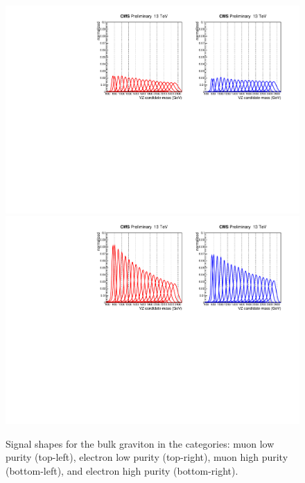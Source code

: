 \begin{figure}[p]
\begin{center}
\includegraphics[scale=0.80]{figures/fits/sigShapeLP.pdf}\\
\includegraphics[scale=0.80]{figures/fits/sigShapeHP.pdf}
\caption[Signal shapes]{Signal shapes for the bulk graviton in the categories: muon low purity (top-left), electron low purity (top-right), muon high purity (bottom-left), and  electron high purity (bottom-right).}
\label{sigShapes}
\end{center}
\end{figure}

